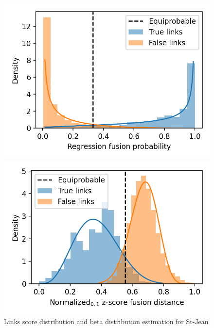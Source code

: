 \begin{figure}
  \caption{Links score distribution and beta distribution estimation for St-Jean}
  \label{fig:links_score_density}

  \label{fig:links_score_density_fusion_regression}
  \includegraphics[width=\linewidth]{img/links_score_density_fusion_regression.png}

  \vspace{0.5cm}

  \label{fig:links_score_density_fusion_z_score}
  \includegraphics[width=\linewidth]{img/links_score_density_fusion_z_score.png}
\end{figure}

